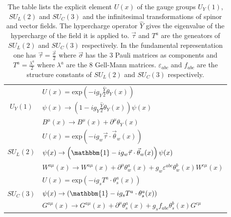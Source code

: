 \begin{table}[H]
\begin{center}
\begin{tabular}{|c|l|}
\hline
 & $U(x) = \mathrm{exp}\left(-ig_Y\frac{\hat{Y}}{2}\theta_Y(x)\right)$\\
 $U_Y(1)$ & $\psi(x) \to \left( 1 - ig_Y\frac{\hat{Y}}{2}\theta_Y(x)\right)\psi(x)$\\
 & $B^\mu(x) \to B^\mu(x) + \partial^\mu\theta_Y(x)$\\
\hline
 & $U(x) = \mathrm{exp}\left(-ig_w \vec{\tau} \cdot \vec{\theta}_w(x)\right)$\\
 $SU_L(2)$ & $\psi(x) \to \left( \mathbbm{1} - ig_w \vec{\tau} \cdot \vec{\theta}_w(x)\right)\psi(x)$\\
 & $W^{a\mu}(x) \to W^{a\mu}(x) +\partial^\mu\theta^a_w(x) + g_w \varepsilon^{abc} \theta^b_w(x)W^{c\mu}(x)$\\
  \hline
 & $U(x) = \mathrm{exp}\left(-ig_s T^a \cdot \theta_s^a(x)\right)$\\
$SU_C(3)$ & $\psi(x) \to \left(\mathbbm{1}-ig_s T^a \cdot \theta_s^a(x)\right)$\\
 & $G^{a\mu}(x) \to G^{a\mu}(x) + \partial^\mu\theta^a_s(x) + g_s f_{abc} \theta^b_s(x)G^{c\mu}$\\
 \hline
\end{tabular}
\caption{The table lists the explicit element $U(x)$ of the gauge groups $U_Y(1)$, $SU_L(2)$ and $SU_C(3)$ and the infinitesimal transformations of spinor and vector fields.\newline
The hypercharge operator $\hat{Y}$ gives the eigenvalue of the hypercharge of the field it is applied to. $\vec{\tau}$ and $T^a$ are the geneators of $SU_L(2)$ and $SU_C(3)$ respectively. In the fundamental representation one has $\vec{\tau} = \frac{\vec{\sigma}}{2}$ where $\vec{\sigma}$ has the 3 Pauli matrices as components and $T^a = \frac{\lambda^a}{2}$ where $\lambda^a$ are the 8 Gell-Mann matrices. $\varepsilon_{abc}$ and $f_{abc}$ are the structure constants of $SU_L(2)$ and $SU_C(3)$ respectively.}\label{tab:SM_transformations}
\end{center}
\end{table}


